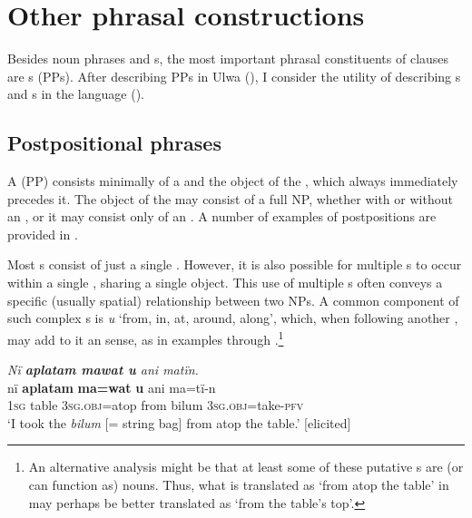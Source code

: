 \newpage

\section{Other phrasal constructions}\label{sec:9.3}


Besides noun phrases and s, the most important phrasal constituents of clauses are s (PPs). After describing PPs in Ulwa (), I consider the utility of describing s and s in the language ().


\subsection{Postpositional phrases}\label{sec:9.3.1}


A  (PP) consists minimally of a  and the object of the , which always immediately precedes it. The object of the  may consist of a full NP, whether with or without an , or it may consist only of an  . A number of examples of postpositions are provided in .

  Most s consist of just a single . However, it is also possible for multiple s to occur within a single , sharing a single object. This use of multiple s often conveys a specific (usually spatial) relationship between two NPs. A common component of such complex s is \textit{u} ‘from, in, at, around, along’, which, when following another , may add to it an  sense, as in examples  through .\footnote{An alternative analysis might be that at least some of these putative s are (or can function as) nouns. Thus, what is translated as ‘from atop the table’ in  may perhaps be better translated as ‘from the table’s top’.}

\ea%
    \label{ex:phrase:97}
          \textit{Nï \textbf{aplatam mawat u} ani matïn.}\\
\gll    nï  \textbf{aplatam}  \textbf{ma=wat}    \textbf{u}    ani    ma=tï-n\\
    1\textsc{sg}  table  3\textsc{sg.obj}=atop  from  bilum  3\textsc{sg.obj}=take-\textsc{pfv}\\
\glt `I took the \textit{bilum} [= string bag] from atop the table.’ [elicited]
\z

